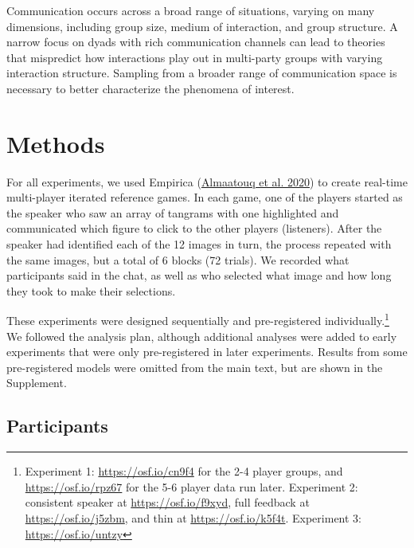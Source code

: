 \documentclass[
  english,
  a4paper,
]{article}
\begin{document}
Communication occurs across a broad range of situations, varying on many dimensions, including group size, medium of interaction, and group structure. A narrow focus on dyads with rich communication channels can lead to theories that mispredict how interactions play out in multi-party groups with varying interaction structure. Sampling from a broader range of communication space is necessary to better characterize the phenomena of interest.

\hypertarget{methods}{%
\section{Methods}\label{methods}}

For all experiments, we used Empirica (\protect\hyperlink{ref-almaatouq2020}{Almaatouq et al. 2020}) to create real-time multi-player iterated reference games. In each game, one of the players started as the speaker who saw an array of tangrams with one highlighted and communicated which figure to click to the other players (listeners). After the speaker had identified each of the 12 images in turn, the process repeated with the same images, but a total of 6 blocks (72 trials). We recorded what participants said in the chat, as well as who selected what image and how long they took to make their selections.

These experiments were designed sequentially and pre-registered individually.\footnote{Experiment 1: \url{https://osf.io/cn9f4} for the 2-4 player groups, and \url{https://osf.io/rpz67} for the 5-6 player data run later. Experiment 2: consistent speaker at \url{https://osf.io/f9xyd}, full feedback at \url{https://osf.io/j5zbm}, and thin at \url{https://osf.io/k5f4t}. Experiment 3: \url{https://osf.io/untzy}} We followed the analysis plan, although additional analyses were added to early experiments that were only pre-registered in later experiments. Results from some pre-registered models were omitted from the main text, but are shown in the Supplement.

\hypertarget{participants}{%
\subsection{Participants}\label{participants}}
\end{document}
